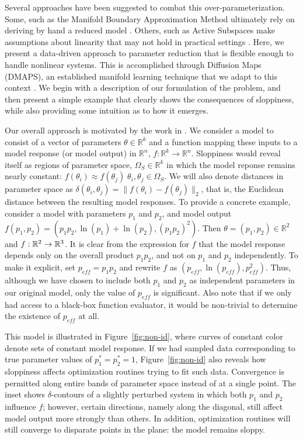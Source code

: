 Several approaches have been suggested to combat this
over-parameterization. Some, such as the Manifold Boundary
Approximation Method ultimately rely on deriving by hand a reduced
model \cite{transtrum_model_2014}. Others, such as Active Subspaces
make assumptions about linearity that may not hold in practical
settings \cite{constantine_active_2015}. Here, we present a
data-driven approach to parameter reduction that is flexible enough to
handle nonlinear systems. This is accomplished through Diffusion Maps
(DMAPS), an established manifold learning technique that we adapt to
this context \cite{coifman_diffusion_2006}. We begin with a
description of our formulation of the problem, and then present a
simple example that clearly shows the consequences of sloppiness,
while also providing some intuition as to how it emerges.

Our overall approach is motivated by the work in
\cite{transtrum_geometry_2011}. We consider a model to consist of a
vector of parameters $\theta \in \mathbb{R}^k$ and a function mapping
these inputs to a model response (or model output) in $\mathbb{R}^n$,
$f: \mathbb{R}^k \rightarrow \mathbb{R}^n$. Sloppiness would reveal
itself as regions of parameter space, $\Omega_S \in \mathbb{R}^k$ in
which the model reponse remains nearly constant:
$f(\theta_i) \approx f(\theta_j)\; \theta_i, \theta_j \in
\Omega_S$. We will also denote distances in parameter space as
$\delta(\theta_i, \theta_j) = \| f(\theta_i) - f(\theta_j)\|_2$, that
is, the Euclidean distance between the resulting model responses. To
provide a concrete example, consider a model with parameters $p_1$ and
$p_2$, and model output
$f(p_1, p_2) = (p_1 p_2 , \ln(p_1) + \ln(p_2) , (p_1 p_2)^2)$. Then
$\theta = (p_1, p_2) \in \mathbb{R}^2$ and $f: \mathbb{R}^2 \rightarrow
\mathbb{R}^3$. It is clear from the expression for $f$ that the model response
depends only on the overall product $p_1 p_2$, and not on $p_1$ and
$p_2$ independently. To make it explicit, set $p_{eff} = p_1 p_2$ and
rewrite $f$ as $(p_{eff}, \ln(p_{eff}), p_{eff}^2)$. Thus, although we
have chosen to include both $p_1$ and $p_2$ as independent parameters
in our original model, only the value of $p_{eff}$ is significant. Also note
that if we only had access to a black-box function evaluator, it would
be non-trivial to determine the existence of $p_{eff}$ at all.

This model is illustrated in Figure~\ref{fig:non-id}, where curves of
constant color denote sets of constant model response. If we had
sampled data corresponding to true parameter values of
$p_1^* = p_2^* = 1$, Figure~\ref{fig:non-id} also reveals how
sloppiness affects optimization routines trying to fit such
data. Convergence is permitted along entire bands of parameter space
instead of at a single point. The inset shows $\delta$-contours of a
slightly perturbed system in which both $p_1$ and $p_2$ influence $f$;
however, certain directions, namely along the diagonal, still affect
model output more strongly than others. In addition, optimization
routines will still converge to disparate points in the plane: the
model remains sloppy.

